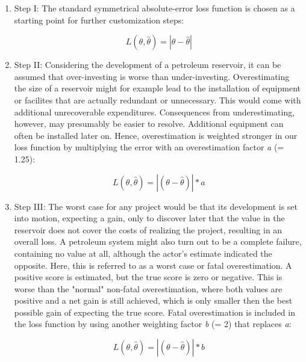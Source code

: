 	\begin{enumerate}
		\item Step I: The standard symmetrical absolute-error loss function is chosen as a starting point for further customization steps:
		
		\begin{equation}
		L(\theta,\hat{\theta}) = |\theta - \hat{\theta}|
		\end{equation}  
		
		\item Step II: Considering the development of a petroleum reservoir, it can be assumed that over-investing is worse than under-investing. Overestimating the size of a reservoir might for example lead to the installation of equipment or facilites that are actually redundant or unnecessary. This would come with additional unrecoverable expenditures. Consequences from underestimating, however, may presumably be easier to resolve. Additional equipment can often be installed later on. Hence, overestimation is weighted stronger in our loss function by multiplying the error with an overestimation factor \textit{a} (= 1.25):
		
		\begin{equation}\label{eq:LF_II}
		L(\theta,\hat{\theta}) = |(\theta-\hat{\theta})|*a
		\end{equation}
		
		\item Step III: The worst case for any project would be that its development is set into motion, expecting a gain, only to discover later that the value in the reservoir does not cover the costs of realizing the project, resulting in an overall loss. A petroleum system might also turn out to be a complete failure, containing no value at all, although the actor's estimate indicated the opposite. Here, this is referred to as a worst case or fatal overestimation. A positive score is estimated, but the true score is zero or negative. This is worse than the "normal" non-fatal overestimation, where both values are positive and a net gain is still achieved, which is only smaller then the best possible gain of expecting the true score. Fatal overestimation is included in the loss function by using another weighting factor \textit{b} (= 2) that replaces \textit{a}:
		
		\begin{equation}\label{eq:LF_III}
		L(\theta,\hat{\theta}) = |(\theta-\hat{\theta})|*b
		\end{equation}
		

\end{enumerate}
